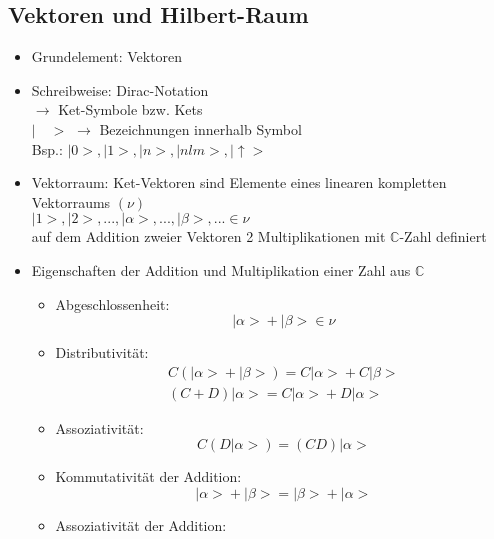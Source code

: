 \documentclass[10pt,article,colorback,accentcolor=tud9d]{scrartcl}
\begin{document}
\subsection{Vektoren und Hilbert-Raum}
\begin{itemize}
\item Grundelement: Vektoren
\item Schreibweise: Dirac-Notation\\
$\rightarrow$ Ket-Symbole bzw. Kets\\
$\left| \quad > \right.$ $\rightarrow$ Bezeichnungen innerhalb Symbol\\
Bsp.: $\left| 0>\right.,\left|1>\right.,\left|n>\right.,\left|nlm>\right.,\left| \uparrow>\right.$
\item Vektorraum: Ket-Vektoren sind Elemente eines linearen kompletten Vektorraums $(\nu)$\\
$\left|1>\right.,\left|2>\right.,...,\left|\alpha>\right.,...,\left|\beta>\right.,... \in \nu$\\
auf dem Addition zweier Vektoren 2 Multiplikationen mit $\mathbb{C}$-Zahl definiert
\item Eigenschaften der Addition und Multiplikation einer Zahl aus $\mathbb{C}$
\begin{fleqn}
\begin{itemize}
\item Abgeschlossenheit: 
\begin{equation} 
\left| \alpha >\right.+\left|\beta>\right. \in \nu
\end{equation}
\item Distributivität: 
\begin{equation}
\begin{aligned}
C(\left|\alpha>\right. +\left|\beta>\right.) = C\left|\alpha>\right. +C\left|\beta>\right.\\
(C+D)\left|\alpha>\right. = C\left|\alpha>\right. +D\left|\alpha>\right.
\end{aligned}
\end{equation}
\item Assoziativität: 
\begin{equation}
C(D\left|\alpha>\right.)=(CD)\left|\alpha>\right.
\end{equation}
\item Kommutativität der Addition: 
\begin{equation}
\left|\alpha>\right. + \left|\beta>\right. =\left|\beta>\right. + \left|\alpha>\right.
\end{equation}
\item Assoziativität der Addition: 

\end{itemize}
\end{fleqn}
\end{itemize}
\end{document}
